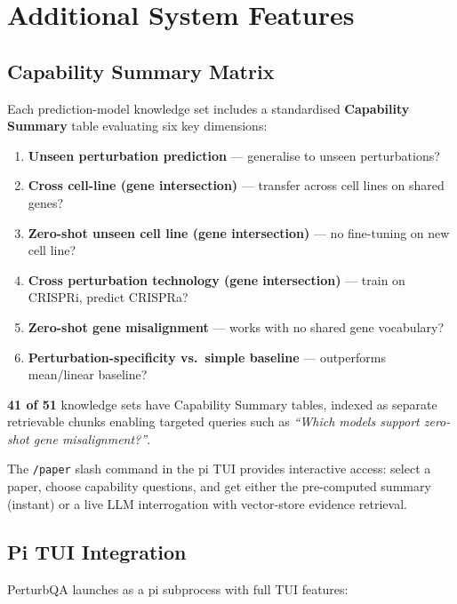 \documentclass[12pt, a4paper]{article}
\begin{document}
\section{Additional System Features}
\label{sec:extra}

\subsection{Capability Summary Matrix}

Each prediction-model knowledge set includes a standardised \textbf{Capability Summary}
table evaluating six key dimensions:

\begin{enumerate}[nosep]
  \item \textbf{Unseen perturbation prediction} --- generalise to unseen perturbations?
  \item \textbf{Cross cell-line (gene intersection)} --- transfer across cell lines on shared genes?
  \item \textbf{Zero-shot unseen cell line (gene intersection)} --- no fine-tuning on new cell line?
  \item \textbf{Cross perturbation technology (gene intersection)} --- train on CRISPRi, predict CRISPRa?
  \item \textbf{Zero-shot gene misalignment} --- works with no shared gene vocabulary?
  \item \textbf{Perturbation-specificity vs.\ simple baseline} --- outperforms mean/linear baseline?
\end{enumerate}

\textbf{41 of 51} knowledge sets have Capability Summary tables, indexed as separate
retrievable chunks enabling targeted queries such as
\textit{``Which models support zero-shot gene misalignment?''}.

The \texttt{/paper} slash command in the pi TUI provides interactive access: select a
paper, choose capability questions, and get either the pre-computed summary (instant)
or a live LLM interrogation with vector-store evidence retrieval.

\subsection{Pi TUI Integration}

PerturbQA launches as a pi subprocess with full TUI features:
\end{document}
